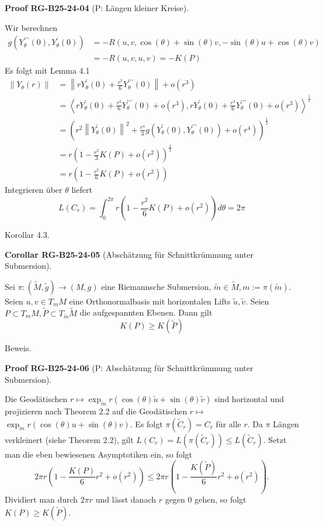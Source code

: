 \documentclass[10pt, letterpaper]{article}
\newcommand{\CustomHeading}[3]{%
  \par\medskip\noindent%
  \textbf{#1 #2} \textnormal{(#3)}.\enskip%
}
\newenvironment{KORO}[2]{\begin{unitbox}\CustomHeading{Corollar}{#1}{#2}}{\end{unitbox}}
\newenvironment{PROOF}[2]{\begin{unitbox}\CustomHeading{Proof}{#1}{#2}}{\end{unitbox}}
\begin{document}
\begin{PROOF}{RG-B25-24-04}{P: Längen kleiner Kreise}
Wir berechnen
$$
\begin{aligned}
g\left(Y_{\theta}^{\prime \prime \prime}(0), Y_{\theta}^{\prime}(0)\right) & =-R(u, v, \cos (\theta)+\sin (\theta) v,-\sin (\theta) u+\cos (\theta) v) \\
& =-R(u, v, u, v)=-K(P)
\end{aligned}
$$
Es folgt mit Lemma 4.1
$$
\begin{aligned}
\left\|Y_{\theta}(r)\right\| & =\left\|r Y_{\theta}^{\prime}(0)+\frac{r^{3}}{6} Y_{\theta}^{\prime \prime \prime}(0)\right\|+o\left(r^{3}\right) \\
& =\left\langle r Y_{\theta}^{\prime}(0)+\frac{r^{3}}{6} Y_{\theta}^{\prime \prime \prime}(0)+o\left(r^{3}\right), r Y_{\theta}^{\prime}(0)+\frac{r^{3}}{6} Y_{\theta}^{\prime \prime \prime}(0)+o\left(r^{3}\right)\right\rangle^{\frac{1}{2}} \\
& =\left(r^{2}\left\|Y_{\theta}^{\prime}(0)\right\|^{2}+\frac{r^{4}}{3} g\left(Y_{\theta}^{\prime}(0), Y_{\theta}^{\prime \prime \prime}(0)\right)+o\left(r^{4}\right)\right)^{\frac{1}{2}} \\
& =r\left(1-\frac{r^{2}}{3} K(P)+o\left(r^{2}\right)\right)^{\frac{1}{2}} \\
& =r\left(1-\frac{r^{2}}{6} K(P)+o\left(r^{2}\right)\right)
\end{aligned}
$$
Integrieren über $\theta$ liefert
$$L\left(C_{r}\right)=\int_{0}^{2 \pi} r\left(1-\frac{r^{2}}{6} K(P)+o\left(r^{2}\right)\right) d \theta=2 \pi$$
\end{PROOF}



Korollar 4.3. 


\begin{KORO}{RG-B25-24-05}{Abschätzung für Schnittkrümmung unter Submersion}
Sei $\pi:(\tilde{M}, \tilde{g}) \rightarrow(M, g)$ eine Riemannsche Submersion, $\tilde{m} \in \tilde{M}, m:=\pi(\tilde{m})$. Seien $u, v \in T_{m} M$ eine Orthonormalbasis mit horizontalen Lifts $\tilde{u}, \tilde{v}$. Seien $P \subset T_{m} M, \tilde{P} \subset T_{\tilde{m}} \tilde{M}$ die aufgespannten Ebenen. Dann gilt
$$
K(P) \geq K(\tilde{P})
$$
\end{KORO}


Beweis. 


\begin{PROOF}{RG-B25-24-06}{P: Abschätzung für Schnittkrümmung unter Submersion}
Die Geodätischen $r \mapsto \exp _{\tilde{m}} r(\cos (\theta) \tilde{u}+\sin (\theta) \tilde{v})$ sind horizontal und projizieren nach Theorem 2.2 auf die Geodätischen $r \mapsto$ $\exp _{m} r(\cos (\theta) u+\sin (\theta) v)$. Es folgt $\pi\left(\tilde{C}_{r}\right)=C_{r}$ für alle $r$. Da $\pi$ Längen verkleinert (siehe Theorem 2.2), gilt $L\left(C_{r}\right)=L\left(\pi\left(\tilde{C}_{r}\right)\right) \leq L\left(\tilde{C}_{r}\right)$. Setzt man die eben bewiesenen Asymptotiken ein, so folgt
$$
2 \pi r\left(1-\frac{K(P)}{6} r^{2}+o\left(r^{2}\right)\right) \leq 2 \pi r\left(1-\frac{K(\tilde{P})}{6} r^{2}+o\left(r^{2}\right)\right) .
$$
Dividiert man durch $2 \pi r$ und lässt danach $r$ gegen 0 gehen, so folgt $K(P) \geq K(\tilde{P})$.
\end{PROOF}
\end{document}
